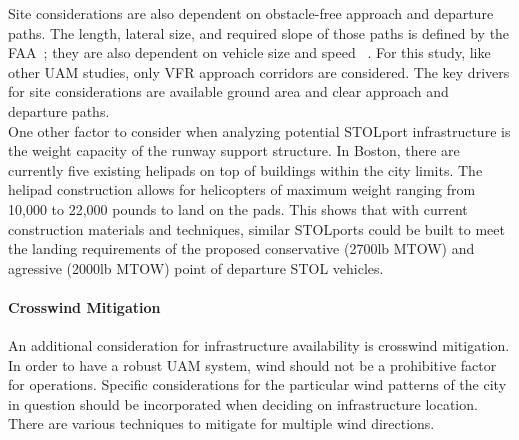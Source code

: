 \documentclass[]{aiaa-tc}%
\begin{document}
Site considerations are also dependent on obstacle-free approach and departure paths. The length, lateral size, and required slope of those paths is defined by the FAA~\cite{AC150}; they are also dependent on vehicle size and speed ~\cite{AC150}. For this study, like other UAM studies\cite{Uber}, only VFR approach corridors are considered. The key drivers for site considerations are available ground area and clear approach and departure paths.\\

One other factor to consider when analyzing potential STOLport infrastructure is the weight capacity of the runway support structure. In Boston, there are currently five existing helipads on top of buildings within the city limits. The helipad construction allows for helicopters of maximum weight ranging from 10,000 to 22,000 pounds to land on the pads. This shows that with current construction materials and techniques, similar STOLports could be built to meet the landing requirements of the proposed conservative (2700lb MTOW) and agressive (2000lb MTOW) point of departure STOL vehicles.

\paragraph{Crosswind Mitigation}

An additional consideration for infrastructure availability is crosswind mitigation. In order to have a robust UAM system, wind should not be a prohibitive factor for operations. Specific considerations for the particular wind patterns of the city in question should be incorporated when deciding on infrastructure location. There are various techniques to mitigate for multiple wind directions. 
\end{document}
